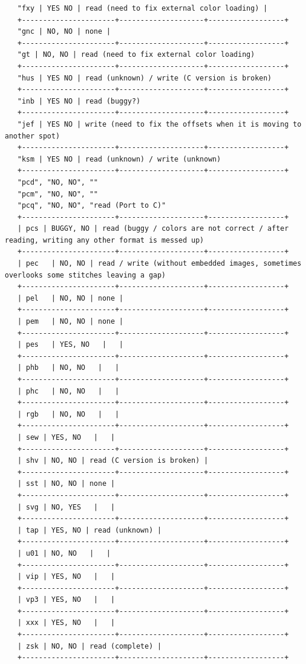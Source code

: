 \documentclass[11pt]{report}
\begin{document}
\begin{verbatim}
   "fxy | YES NO | read (need to fix external color loading) |
   +----------------------+--------------------+------------------+
   "gnc | NO, NO | none |
   +----------------------+--------------------+------------------+
   "gt | NO, NO | read (need to fix external color loading)
   +----------------------+--------------------+------------------+
   "hus | YES NO | read (unknown) / write (C version is broken)
   +----------------------+--------------------+------------------+
   "inb | YES NO | read (buggy?)
   +----------------------+--------------------+------------------+
   "jef | YES NO | write (need to fix the offsets when it is moving to another spot)
   +----------------------+--------------------+------------------+
   "ksm | YES NO | read (unknown) / write (unknown)
   +----------------------+--------------------+------------------+
   "pcd", "NO, NO", ""
   "pcm", "NO, NO", ""
   "pcq", "NO, NO", "read (Port to C)"
   +----------------------+--------------------+------------------+
   | pcs | BUGGY, NO | read (buggy / colors are not correct / after reading, writing any other format is messed up)
   +----------------------+--------------------+------------------+
   | pec   | NO, NO | read / write (without embedded images, sometimes overlooks some stitches leaving a gap)
   +----------------------+--------------------+------------------+
   | pel   | NO, NO | none |
   +----------------------+--------------------+------------------+
   | pem   | NO, NO | none |
   +----------------------+--------------------+------------------+
   | pes   | YES, NO   |   |
   +----------------------+--------------------+------------------+
   | phb   | NO, NO   |   |
   +----------------------+--------------------+------------------+
   | phc   | NO, NO   |   |
   +----------------------+--------------------+------------------+
   | rgb   | NO, NO   |   |
   +----------------------+--------------------+------------------+
   | sew | YES, NO   |   |
   +----------------------+--------------------+------------------+
   | shv | NO, NO | read (C version is broken) |
   +----------------------+--------------------+------------------+
   | sst | NO, NO | none |
   +----------------------+--------------------+------------------+
   | svg | NO, YES   |   |
   +----------------------+--------------------+------------------+
   | tap | YES, NO | read (unknown) |
   +----------------------+--------------------+------------------+
   | u01 | NO, NO   |   |
   +----------------------+--------------------+------------------+
   | vip | YES, NO   |   |
   +----------------------+--------------------+------------------+
   | vp3 | YES, NO   |   |
   +----------------------+--------------------+------------------+
   | xxx | YES, NO   |   |
   +----------------------+--------------------+------------------+
   | zsk | NO, NO | read (complete) |
   +----------------------+--------------------+------------------+
   

\end{verbatim}
\end{document}
